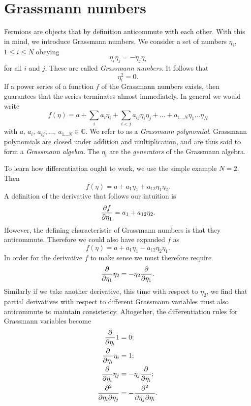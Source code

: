 \section{Grassmann numbers}
Fermions are objects that by definition anticommute with each other. 
With this in mind, we introduce Grassmann numbers.
We consider a set of numbers $\eta_i$, $1\leq i\leq N$ obeying
\begin{equation}
  \eta_i\eta_j=-\eta_j\eta_i
\end{equation}
for all $i$ and $j$. These are called {\it Grassmann numbers}.
It follows that
\begin{equation}\label{eq:gnilpotent}
  \eta_i^2=0.
\end{equation}
If a power series of a function $f$ of the Grassmann numbers exists, then
 guarantees that the series terminates almost
immediately. In general we would write
\begin{equation}\label{eq:grasspoly}
  f(\eta)=a+\sum_ia_i\eta_i+\sum_{i<j}a_{ij}\eta_i\eta_j
           +...+a_{1...N}\eta_1...\eta_N
\end{equation}
with $a,\,a_i,\,a_{ij},...,\,a_{1...N}\in\mathbb{C}$.
We refer to  as a {\it Grassmann polynomial}.
Grassmann polynomials are closed under addition and multiplication,
and are thus said to form a {\it Grassmann algebra}. The $\eta_i$
are the {\it generators} of the Grassmann algebra.

To learn how differentiation ought to work, we use the simple example
$N=2$. Then
\begin{equation}
  f(\eta)=a+a_1\eta_1+a_{12}\eta_1\eta_2.
\end{equation}
A definition of the derivative that follows our intuition is
\begin{equation}
  \pdv{f}{\eta_1}=a_1+a_{12}\eta_2.
\end{equation}
However, the defining characteristic of Grassmann numbers is that they
anticommute. Therefore we could also have expanded $f$ as
\begin{equation}
  f(\eta)=a+a_1\eta_1-a_{12}\eta_2\eta_1.
\end{equation}
In order for the derivative $f$ to make sense we must therefore require
\begin{equation}
  \pdv{\eta_1}\eta_2=
  -\eta_2\pdv{\eta_1}.
\end{equation}
Similarly if we take another derivative, this time with respect to $\eta_2$,
we find that partial derivatives with respect to different Grassmann variables
must also anticommute to maintain consistency. Altogether, the differentiation
rules for Grassmann variables become
\begin{equation}\begin{aligned}
  \pdv{\eta_i}1&=0;\\
  \pdv{\eta_i}\eta_i&=1;\\
  \pdv{\eta_i}\eta_j&=
  -\eta_j\pdv{\eta_i};\\
  \frac{\partial^2}{\partial\eta_i\partial\eta_j}&=
  -\frac{\partial^2}{\partial\eta_j\partial\eta_i}.
\end{aligned}\end{equation}

